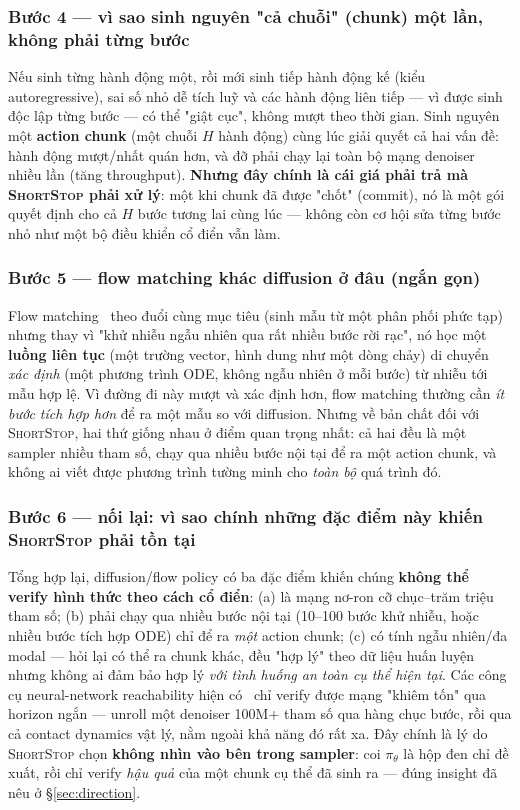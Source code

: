\documentclass[a4paper,12pt]{article}
\newcommand{\st}{\textsc{ShortStop}}
\begin{document}
\subsubsection{Bước 4 --- vì sao sinh nguyên "cả chuỗi" (chunk) một lần, không phải từng bước}
Nếu sinh từng hành động một, rồi mới sinh tiếp hành động kế (kiểu autoregressive), sai số nhỏ dễ tích luỹ và các hành động liên tiếp --- vì được sinh độc lập từng bước --- có thể "giật cục", không mượt theo thời gian. Sinh nguyên một \textbf{action chunk} (một chuỗi $H$ hành động) cùng lúc giải quyết cả hai vấn đề: hành động mượt/nhất quán hơn, và đỡ phải chạy lại toàn bộ mạng denoiser nhiều lần (tăng throughput). \textbf{Nhưng đây chính là cái giá phải trả mà \st{} phải xử lý}: một khi chunk đã được "chốt" (commit), nó là một gói quyết định cho cả $H$ bước tương lai cùng lúc --- không còn cơ hội sửa từng bước nhỏ như một bộ điều khiển cổ điển vẫn làm.

\subsubsection{Bước 5 --- flow matching khác diffusion ở đâu (ngắn gọn)}
Flow matching~\cite{lipman2023flow} theo đuổi cùng mục tiêu (sinh mẫu từ một phân phối phức tạp) nhưng thay vì "khử nhiễu ngẫu nhiên qua rất nhiều bước rời rạc", nó học một \textbf{luồng liên tục} (một trường vector, hình dung như một dòng chảy) di chuyển \emph{xác định} (một phương trình ODE, không ngẫu nhiên ở mỗi bước) từ nhiễu tới mẫu hợp lệ. Vì đường đi này mượt và xác định hơn, flow matching thường cần \emph{ít bước tích hợp hơn} để ra một mẫu so với diffusion. Nhưng về bản chất đối với \st{}, hai thứ giống nhau ở điểm quan trọng nhất: cả hai đều là một sampler nhiều tham số, chạy qua nhiều bước nội tại để ra một action chunk, và không ai viết được phương trình tường minh cho \emph{toàn bộ} quá trình đó.

\subsubsection{Bước 6 --- nối lại: vì sao chính những đặc điểm này khiến \st{} phải tồn tại}
Tổng hợp lại, diffusion/flow policy có ba đặc điểm khiến chúng \textbf{không thể verify hình thức theo cách cổ điển}: (a) là mạng nơ-ron cỡ chục--trăm triệu tham số; (b) phải chạy qua nhiều bước nội tại (10--100 bước khử nhiễu, hoặc nhiều bước tích hợp ODE) chỉ để ra \emph{một} action chunk; (c) có tính ngẫu nhiên/đa modal --- hỏi lại có thể ra chunk khác, đều "hợp lý" theo dữ liệu huấn luyện nhưng không ai đảm bảo hợp lý \emph{với tình huống an toàn cụ thể hiện tại}. Các công cụ neural-network reachability hiện có~\cite{ivanov2019verisig,tran2020nnv,huang2019reachnn} chỉ verify được mạng "khiêm tốn" qua horizon ngắn --- unroll một denoiser 100M+ tham số qua hàng chục bước, rồi qua cả contact dynamics vật lý, nằm ngoài khả năng đó rất xa. Đây chính là lý do \st{} chọn \textbf{không nhìn vào bên trong sampler}: coi $\pi_\theta$ là hộp đen chỉ đề xuất, rồi chỉ verify \emph{hậu quả} của một chunk cụ thể đã sinh ra --- đúng insight đã nêu ở \S\ref{sec:direction}.
\end{document}
